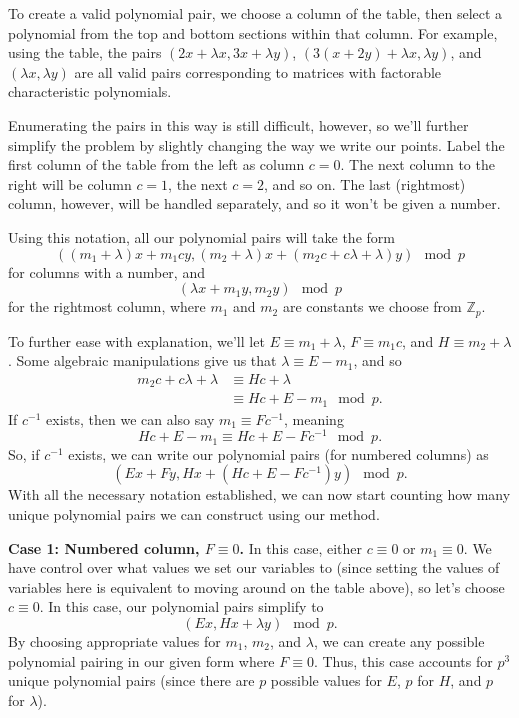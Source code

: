 \documentclass[a4paper, 12pt, reqno]{amsart}
\newcommand{\Z}{\mathbb{Z}}
\begin{document}
	To create a valid polynomial pair, we choose a column of the table, then select a polynomial from the top and bottom sections within that column. For example, using the
	table, the pairs $(2x+\lambda x, 3x+\lambda y)$, $(3(x+2y)+\lambda x, \lambda y)$, and $(\lambda x, \lambda y)$ are all valid pairs corresponding to matrices with 
	factorable characteristic polynomials.
	
	Enumerating the pairs in this way is still difficult, however, so we'll further simplify the problem by slightly changing the way we write our points. Label the first
	column of the table from the left as column $c=0$. The next column to the right will be column $c=1$, the next $c=2$, and so on. The last (rightmost) column, however, 
	will be handled separately, and so it won't be given a number.
	
	Using this notation, all our polynomial pairs will take the form
	\[
		((m_1+\lambda)x + m_1cy, (m_2+\lambda)x+(m_2c+c\lambda+\lambda)y) \mod{p}
	\]
	for columns with a number, and
	\[
		(\lambda x + m_1y, m_2y) \mod{p}
	\]
	for the rightmost column, where $m_1$ and $m_2$ are constants we choose from $\Z_p$.
	
	To further ease with explanation, we'll let $E \equiv m_1 + \lambda$, $F \equiv m_1c$, and $H \equiv m_2 + \lambda$. Some algebraic manipulations give us that 
	$\lambda \equiv E - m_1$, and so
	\begin{align*}
		m_2c + c\lambda + \lambda &\equiv Hc + \lambda \\
		                          &\equiv Hc + E - m_1 \mod{p}.
	\end{align*}
	If $c^{-1}$ exists, then we can also say $m_1 \equiv Fc^{-1}$, meaning
	\[
		Hc + E - m_1 \equiv Hc + E - Fc^{-1} \mod{p}.
	\]
	So, if $c^{-1}$ exists, we can write our polynomial pairs (for numbered columns) as
	\[
		(Ex + Fy, Hx + (Hc + E - Fc^{-1})y) \mod{p}.
	\]
	With all the necessary notation established, we can now start counting how many unique polynomial pairs we can construct using our method.
	
	\textbf{Case 1: Numbered column, $F \equiv 0$.} In this case, either $c \equiv 0$ or $m_1 \equiv 0$. We have control over what values we set our variables to (since 
	setting the values of variables here is equivalent to moving around on the table above), so let's choose $c \equiv 0$. In this case, our polynomial pairs simplify to
	\[
		(Ex, Hx + \lambda y) \mod{p}.
	\]
	By choosing appropriate values for $m_1$, $m_2$, and $\lambda$, we can create any possible polynomial pairing in our given form where $F \equiv 0$. Thus, this case accounts
	for $p^3$ unique polynomial pairs (since there are $p$ possible values for $E$, $p$ for $H$, and $p$ for $\lambda$).
	
\end{document}

